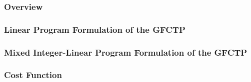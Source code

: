\subsubsection{Overview}


\subsubsection{Linear Program Formulation of the GFCTP}


\subsubsection{Mixed Integer-Linear Program Formulation of the GFCTP}


\subsubsection{Cost Function}

